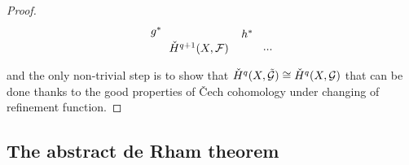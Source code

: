 \documentclass[a4paper,12pt]{article}
\begin{document}
\begin{proof}
\begin{equation}
\begin{tikzpicture}[x=0.75pt,y=0.75pt,yscale=-1,xscale=1]
\draw (524.47,165.81) node [anchor=north west][inner sep=0.75pt]    {$h^{*}$};
\draw (417.9,162.4) node [anchor=north west][inner sep=0.75pt]    {$g^{*}$};
\draw (439.57,179.34) node [anchor=north west][inner sep=0.75pt]    {$\Check{H}^{q+1}(X,\mathcal{F})$};
\draw (549.94,188.81) node [anchor=north west][inner sep=0.75pt]    {$...$};
\end{tikzpicture}   
\end{equation}
and the only non-trivial step is to show that $\Check{H}^{q}( X,\Tilde{\mathcal{G}}) \cong \Check{H}^{q}( X,{\mathcal{G}})$ that can be done thanks to the good properties of Čech cohomology under changing of refinement function. 
\end{proof}


\subsection{The abstract de Rham theorem}
\end{document}
